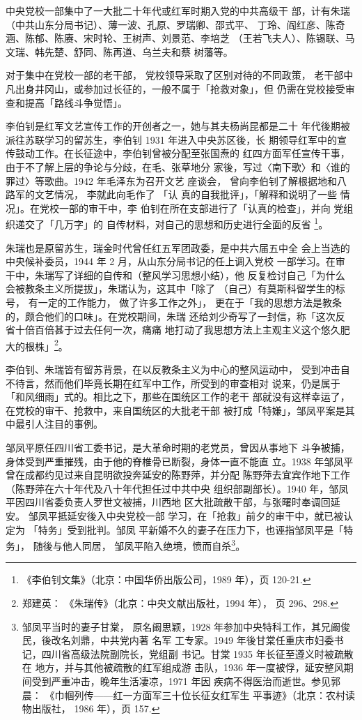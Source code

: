 中央党校一部集中了一大批二十年代或红军时期入党的中共高级干
部，计有朱瑞（中共山东分局书记）、薄一波、孔原、罗瑞卿、邵式平、
丁玲、阎红彦、陈奇涵、陈郁、陈赓、宋时轮、王树声、刘景范、李培芝
（王若飞夫人）、陈锡联、马文瑞、韩先楚、舒同、陈再道、乌兰夫和蔡
树藩等。

对于集中在党校一部的老干部，
党校领导采取了区别对待的不同政策，
老干部中凡出身井冈山，或参加过长征的，一般不属于「抢救对象」，但
仍需在党校接受审查和提高「路线斗争觉悟」。

李伯钊是红军文艺宣传工作的开创者之一，她与其夫杨尚昆都是二十 年代後期被
派往苏联学习的留苏生，李伯钊 1931 年进入中央苏区後，长 期领导红军中的宣
传鼓动工作。在长征途中，李伯钊曾被分配至张国焘的 红四方面军任宣传干事，
由于不了解上层的争论与分歧，在毛、张草地分 家後，写过〈南下歌〉和〈谁的
罪过〉等歌曲。1942 年毛泽东为召开文艺 座谈会， 曾向李伯钊了解根据地和八
路军的文艺情况， 李就此向毛作了 「认 真的自我批评」，「解释和说明了一些
情况」。在党校一部的审干中，李 伯钊在所在支部进行了「认真的检查」，并向
党组织递交了「几万字」的 自传材料，对自己的思想和历史进行全面的反省
\footnote{《李伯钊文集》（北京：中国华侨出版公司，1989 年），页
120-21.}。

朱瑞也是原留苏生，瑞金时代曾任红五军团政委，是中共六届五中全 会上当选的
中央候补委员，1944 年 2 月，从山东分局书记的任上调入党校 一部学习。在审
干中，朱瑞写了详细的自传和（整风学习思想小结），他 反复检讨自己「为什么
会被教条主义所提拔」，朱瑞认为，这其中「除了 （自己）有莫斯科留学生的标
号， 有一定的工作能力， 做了许多工作之外」， 更在于「我的思想方法是教条
的，颇合他们的口味」。在党校期间，朱瑞 还给刘少奇写了一封信，称「这次反
省十倍百倍甚于过去任何一次，痛痛 地打动了我思想方法上主观主义这个悠久肥
大的根株」\footnote{郑建英： 《朱瑞传》（北京：中央文献出版社，1994
年）， 页 296、298.}。

李伯钊、朱瑞皆有留苏背景，在以反教条主义为中心的整风运动中，
受到冲击自不待言，然而他们毕竟长期在红军中工作，所受到的审查相对
说来，仍是属于「和风细雨」式的。相比之下，那些在国统区工作的老干
部就没有这样幸运了，在党校的审干、抢救中，来自国统区的大批老干部
被打成「特嫌」，邹凤平案是其中最引人注目的事例。
 
 
邹凤平原任四川省工委书记，是大革命时期的老党员，曾因从事地下 斗争被捕，
身体受到严重摧残，由于他的脊椎骨已断裂，身体一直不能直 立。1938 年邹凤平
曾在成都约见过来自昆明欲投奔延安的陈野萍，并分配 陈野萍去宜宾作地下工作
（陈野萍在六十年代及八十年代担任过中共中央 组织部副部长）。1940 年，邹凤
平因四川省委负责人罗世文被捕，川西地 区大批疏散干部，与张曙时奉调回延安。
邹凤平抵延安後入中央党校一部 学习，在「抢救」前夕的审干中，就已被认定为
「特务」受到批判。邹凤 平新婚不久的妻子在压力下，也诬指邹凤平是「特务」，
随後与他人同居， 邹凤平陷入绝境，愤而自杀\footnote{邹凤平当时的妻子甘棠，
原名阚思颖，1928 年参加中央特科工作，其兄阚俊民，後改名刘鼎，中共党内著
名军 工专家。1949 年後甘棠任重庆市妇委书记，四川省高级法院副院长，党组副
书记。甘棠 1935 年长征至遵义时被疏散在 地方，并与其他被疏散的红军组成游
击队，1936 年一度被俘，延安整风期间受到严重冲击，晚年生活凄凉，1971 年因
疾病不得医治而逝世。参见郭晨： 《巾帼列传——红一方面军三十位长征女红军生
平事迹》（北京：农村读物出版社， 1986 年），页 157. }。

